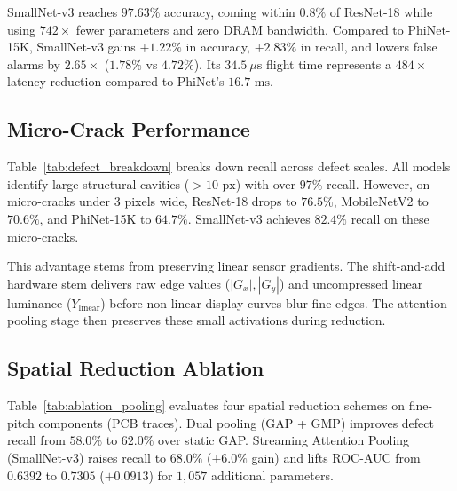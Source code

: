 \documentclass[conference]{IEEEtran}
\begin{document}
\begin{table}[t]
\centering
\caption{Defect Scale Breakdown: Detection Recall (\%)}
\label{tab:defect_breakdown}
\end{table}

SmallNet-v3 reaches $97.63\%$ accuracy, coming within $0.8\%$ of ResNet-18 while using $742\times$ fewer parameters and zero DRAM bandwidth. Compared to PhiNet-15K, SmallNet-v3 gains $+1.22\%$ in accuracy, $+2.83\%$ in recall, and lowers false alarms by $2.65\times$ ($1.78\%$ vs $4.72\%$). Its $34.5\ \mu\text{s}$ flight time represents a $484\times$ latency reduction compared to PhiNet's $16.7\text{ ms}$.

\subsection{Micro-Crack Performance}
Table~\ref{tab:defect_breakdown} breaks down recall across defect scales. All models identify large structural cavities ($>10\text{ px}$) with over $97\%$ recall. However, on micro-cracks under 3 pixels wide, ResNet-18 drops to $76.5\%$, MobileNetV2 to $70.6\%$, and PhiNet-15K to $64.7\%$. SmallNet-v3 achieves $\mathbf{82.4\%}$ recall on these micro-cracks.

This advantage stems from preserving linear sensor gradients. The shift-and-add hardware stem delivers raw edge values ($|G_x|, |G_y|$) and uncompressed linear luminance ($Y_{\text{linear}}$) before non-linear display curves blur fine edges. The attention pooling stage then preserves these small activations during reduction.

\subsection{Spatial Reduction Ablation}
Table~\ref{tab:ablation_pooling} evaluates four spatial reduction schemes on fine-pitch components (PCB traces). Dual pooling (GAP + GMP) improves defect recall from $58.0\%$ to $62.0\%$ over static GAP. Streaming Attention Pooling (SmallNet-v3) raises recall to $\mathbf{68.0\%}$ ($+6.0\%$ gain) and lifts ROC-AUC from $0.6392$ to $\mathbf{0.7305}$ ($+0.0913$) for $1,057$ additional parameters.
\end{document}
